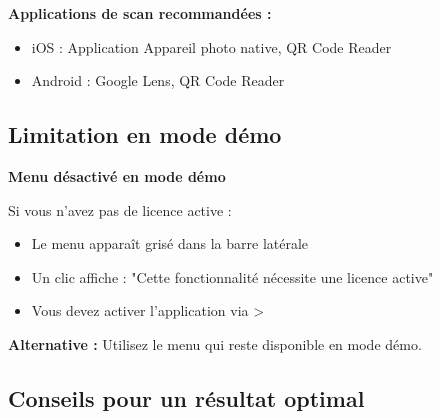 \textbf{Applications de scan recommandées :}
\begin{itemize}[leftmargin=*]
    \item iOS : Application Appareil photo native, QR Code Reader
    \item Android : Google Lens, QR Code Reader
\end{itemize}

\subsection{Limitation en mode démo}

\begin{tcolorbox}[colback=red!5!white,colframe=red!75!black,title=Restriction mode démo]
\textbf{Menu désactivé en mode démo}

Si vous n'avez pas de licence active :
\begin{itemize}[leftmargin=*]
    \item Le menu  apparaît grisé dans la barre latérale
    \item Un clic affiche : "Cette fonctionnalité nécessite une licence active"
    \item Vous devez activer l'application via  > 
\end{itemize}

\textbf{Alternative :} Utilisez le menu  qui reste disponible en mode démo.
\end{tcolorbox}

\subsection{Conseils pour un résultat optimal}

